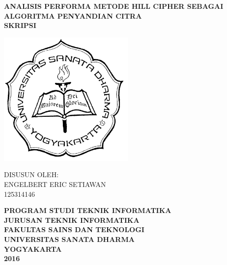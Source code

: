 \begin{center}
	\onehalfspacing\large\bfseries
	\textsc{ANALISIS PERFORMA METODE HILL CIPHER SEBAGAI ALGORITMA PENYANDIAN CITRA}\\
	\vspace{18pt}
	\normalsize SKRIPSI \\
	\vspace{12pt}
	\linespread{1.5}
	\vspace{12pt}
	
	\includegraphics[width=0.5\textwidth]{images/logo-usd.png}
	
	\vspace{12pt}
	DISUSUN OLEH: \\
	ENGELBERT ERIC SETIAWAN \\
	125314146
	
	\vfill
	\textbf{
		PROGRAM STUDI TEKNIK INFORMATIKA \\
		JURUSAN TEKNIK INFORMATIKA\\
		FAKULTAS SAINS DAN TEKNOLOGI \\
		UNIVERSITAS SANATA DHARMA \\
		YOGYAKARTA\\
		2016
	}
	
	
	
\end{center}


\newpage